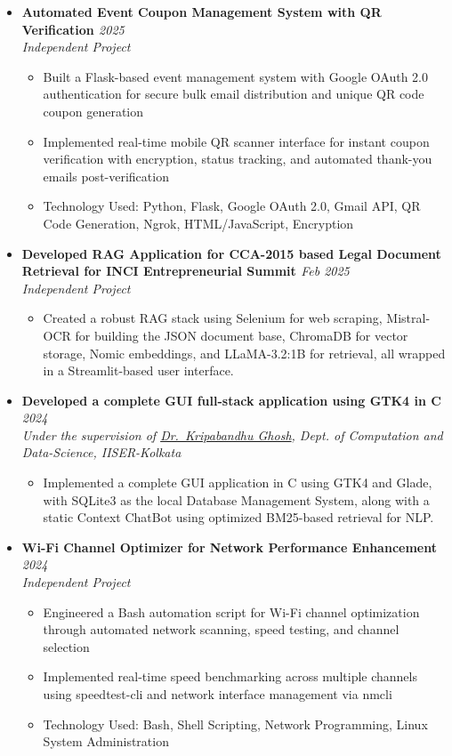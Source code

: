 \documentclass[a4paper,9pt]{article}
\newcommand{\resumeProject}[4]{
    \item\small{
        \textbf{#1} \hfill \textit{#2}\\
        \textit{#3}\\
        \begin{itemize}[leftmargin=1.5em,label=\textbullet,nosep,itemsep=0.5pt]
            #4
        \end{itemize}
    }\vspace{2pt}
}
\begin{document}
{\begin{itemize}[leftmargin=*,label={},itemsep=4pt]
    \resumeProject{Automated Event Coupon Management System with QR Verification \href{https://github.com/Shuvam-Banerji-Seal/Automated-Event-Coupon-Sender-Email-and-Verification-Application}{\faGithub}}{2025}
    {Independent Project}
    {\item Built a Flask-based event management system with Google OAuth 2.0 authentication for secure bulk email distribution and unique QR code coupon generation
    \item Implemented real-time mobile QR scanner interface for instant coupon verification with encryption, status tracking, and automated thank-you emails post-verification
    \item Technology Used: Python, Flask, Google OAuth 2.0, Gmail API, QR Code Generation, Ngrok, HTML/JavaScript, Encryption}
     
    \resumeProject{Developed RAG Application for CCA-2015 based Legal Document Retrieval for INCI Entrepreneurial Summit \href{https://github.com/Shuvam-Banerji-Seal/CCA-2015-LLM}{\faGithub}}{Feb 2025}
    {Independent Project}
    {\item Created a robust RAG stack using Selenium for web scraping, Mistral-OCR for building the JSON document base, ChromaDB for vector storage, Nomic embeddings, and LLaMA-3.2:1B for retrieval, all wrapped in a Streamlit-based user interface.}
     
    \resumeProject{Developed a complete GUI full-stack application using GTK4 in C \href{https://github.com/Shuvam-Banerji-Seal/CS3101-E-Commerce-App-in-C.git}{\faGithub}}{2024}
    {Under the supervision of \href{https://www.iiserkol.ac.in/web/en/people/faculty/cds/kripaghosh/}{Dr.\ Kripabandhu Ghosh}, Dept. of Computation and Data-Science, IISER-Kolkata}
    {\item Implemented a complete GUI application in C using GTK4 and Glade, with SQLite3 as the local Database Management System, along with a static Context ChatBot using optimized BM25-based retrieval for NLP.}
     
    \resumeProject{Wi-Fi Channel Optimizer for Network Performance Enhancement \href{https://github.com/Shuvam-Banerji-Seal/Wi-Fi-channel-optimizer}{\faGithub}}{2024}
    {Independent Project}
    {\item Engineered a Bash automation script for Wi-Fi channel optimization through automated network scanning, speed testing, and channel selection
    \item Implemented real-time speed benchmarking across multiple channels using speedtest-cli and network interface management via nmcli
    \item Technology Used: Bash, Shell Scripting, Network Programming, Linux System Administration}
     

\end{itemize}}
\end{document}
